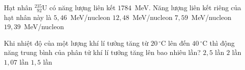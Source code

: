 	\begin{ex}%
		Hạt nhân $^{235}_{\phantom{2}92}\text{U}$ có năng lượng liên kết $1784$~MeV. Năng lượng liên kết riêng của hạt nhân này là
		\choice
		{$5{,}46$~MeV/nucleon}
		{$12{,}48$~MeV/nucleon}
		{\True $7{,}59$~MeV/nucleon}
		{$19{,}39$~MeV/nucleon}
	\end{ex}

	\begin{ex}%
		Khi nhiệt độ của một lượng khí lí tưởng tăng từ $20\,^\circ\text{C}$ lên đến $40\,^\circ\text{C}$ thì động năng trung bình của phân tử khí lí tưởng tăng lên bao nhiêu lần?
		\choice
		{$2{,}5$ lần}
		{$2$ lần}
		{\True $1{,}07$ lần}
		{$1{,}5$ lần}
	\end{ex}

